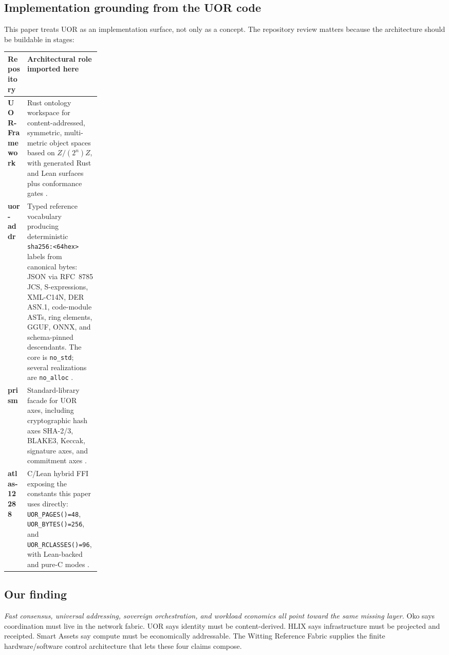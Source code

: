 \documentclass[11pt,letterpaper]{article}
\theoremstyle{remark}
\begin{document}
\subsection{Implementation grounding from the UOR code}

This paper treats UOR as an implementation surface, not only as a concept. The repository
review matters because the architecture should be buildable in stages:

\begin{center}
\renewcommand{\arraystretch}{1.15}
\begin{tabularx}{\linewidth}{>{\raggedright\arraybackslash\bfseries}p{0.21\linewidth}>{\raggedright\arraybackslash}X}
\toprule
\textbf{Repository} & \textbf{Architectural role imported here} \\
\midrule
UOR-Framework &
Rust ontology workspace for content-addressed, symmetric, multi-metric object spaces
based on $Z/(2^n)Z$, with generated Rust and Lean surfaces plus conformance gates
\cite{uor-framework}.\\
uor-addr &
Typed reference vocabulary producing deterministic \texttt{sha256:<64hex>} labels from
canonical bytes: JSON via RFC~8785 JCS, S-expressions, XML-C14N, DER ASN.1, code-module
ASTs, ring elements, GGUF, ONNX, and schema-pinned descendants. The core is
\texttt{no\_std}; several realizations are \texttt{no\_alloc} \cite{uor-addr}.\\
prism &
Standard-library facade for UOR axes, including cryptographic hash axes
SHA-2/3, BLAKE3, Keccak, signature axes, and commitment axes \cite{uor-prism}.\\
atlas-12288 &
C/Lean hybrid FFI exposing the constants this paper uses directly:
\texttt{UOR\_PAGES()=48}, \texttt{UOR\_BYTES()=256}, and
\texttt{UOR\_RCLASSES()=96}, with Lean-backed and pure-C modes \cite{uor-atlas}.\\
\bottomrule
\end{tabularx}
\end{center}

\subsection{Our finding}

\begin{intuition}
\emph{Fast consensus, universal addressing, sovereign orchestration, and workload
economics all point toward the same missing layer.} Oko says coordination must live in the
network fabric. UOR says identity must be content-derived. HLIX says infrastructure must
be projected and receipted. Smart Assets say compute must be economically addressable. The
Witting Reference Fabric supplies the finite hardware/software control architecture that
lets these four claims compose.
\end{intuition}
\end{document}
